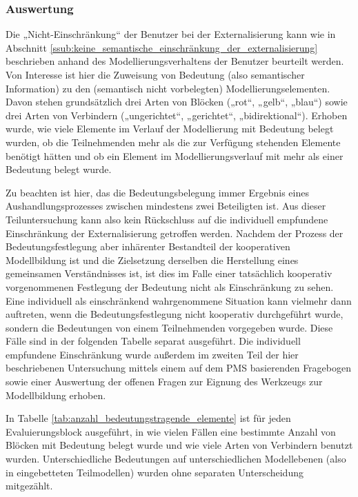 \subsubsection{Auswertung} %

Die „Nicht-Einschränkung“ der Benutzer bei der Externalisierung kann wie in Abschnitt \ref{ssub:keine_semantische_einschränkung_der_externalisierung} beschrieben anhand des Modellierungsverhaltens der Benutzer beurteilt werden. Von Interesse ist hier die Zuweisung von Bedeutung (also semantischer Information) zu den (semantisch nicht vorbelegten) Modellierungselementen. Davon stehen grundsätzlich drei Arten von Blöcken („rot“, „gelb“, „blau“) sowie drei Arten von Verbindern („ungerichtet“, „gerichtet“, „bidirektional“). Erhoben wurde, wie viele Elemente im Verlauf der Modellierung mit Bedeutung belegt wurden, ob die Teilnehmenden mehr als die zur Verfügung stehenden Elemente benötigt hätten und ob ein Element im Modellierungsverlauf mit mehr als einer Bedeutung belegt wurde. 

Zu beachten ist hier, das die Bedeutungsbelegung immer Ergebnis eines Aushandlungsprozesses zwischen mindestens zwei Beteiligten ist. Aus dieser Teiluntersuchung kann also kein Rückschluss auf die individuell empfundene Einschränkung der Externalisierung getroffen werden. Nachdem der Prozess der Bedeutungsfestlegung aber inhärenter Bestandteil der kooperativen Modellbildung ist und die Zielsetzung derselben die Herstellung eines gemeinsamen Verständnisses ist, ist dies im Falle einer tatsächlich kooperativ vorgenommenen Festlegung der Bedeutung nicht als Einschränkung zu sehen. Eine individuell als einschränkend wahrgenommene Situation kann vielmehr dann auftreten, wenn die Bedeutungsfestlegung nicht kooperativ durchgeführt wurde, sondern die Bedeutungen von einem Teilnehmenden vorgegeben wurde. Diese Fälle sind in der folgenden Tabelle separat ausgeführt. Die individuell empfundene Einschränkung wurde außerdem im zweiten Teil der hier beschriebenen Untersuchung mittels einem auf dem \gls{PMS} basierenden Fragebogen sowie einer Auswertung der offenen Fragen zur Eignung des Werkzeugs zur Modellbildung erhoben. 

In Tabelle \ref{tab:anzahl_bedeutungstragende_elemente} ist für jeden Evaluierungsblock ausgeführt, in wie vielen Fällen eine bestimmte Anzahl von Blöcken mit Bedeutung belegt wurde und wie viele Arten von Verbindern benutzt wurden. Unterschiedliche Bedeutungen auf unterschiedlichen Modellebenen (also in eingebetteten Teilmodellen) wurden ohne separaten Unterscheidung mitgezählt.

